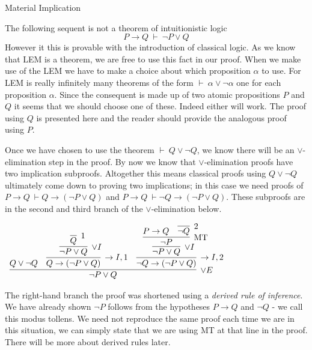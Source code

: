\documentclass{book}
\begin{document}
    \begin{eg}{Material Implication}

        The following sequent is not a theorem of intuitionistic logic $$ P \to Q \ \vdash \ \lnot P \lor Q$$ However it this is provable with the introduction of classical logic. As we know that LEM is a theorem, we are free to use this fact in our proof. When we make use of the LEM we have to make a choice about which proposition $\alpha$ to use. For LEM is really infinitely many theorems of the form $\vdash \ \alpha \lor \lnot \alpha$ one for each proposition $\alpha$. Since the consequent is made up of two atomic propositions $P$ and $Q$ it seems that we should choose one of these. Indeed either will work. The proof using $Q$ is presented here and the reader should provide the analogous proof using $P$. 

        Once we have chosen to use the theorem $\vdash \ Q \lor \lnot Q$, we know there will be an $\lor$-elimination step in the proof. By now we know that $\lor$-elimination proofs have two implication subproofs. Altogether this means classical proofs using $Q \lor \lnot Q$ ultimately come down to proving two implications; in this case we need proofs of $P \to Q \ \vdash Q \to (\lnot P \lor Q)$ and $P \to Q \ \vdash \lnot Q \to (\lnot P \lor Q)$. These subproofs are in the second and third branch of the $\lor$-elimination below. 

        \begin{center}
            $\begin{array}{c}
                \infer[\lor E]{\lnot P \lor Q}
                    {Q \lor \lnot Q
                    &
                    \infer[\to I,1]{Q \to (\lnot P \lor Q)}
                        {\infer[\lor I]{\lnot P \lor Q}
                            {\infer[1]{Q}
                                {}}}
                    &
                    \infer[\to I,2]{\lnot Q \to (\lnot P \lor Q)}
                        {\infer[\lor I]{\lnot P \lor Q}
                            {\infer[\MT]{\lnot P} 
                                {P \to Q
                                &
                                \infer[2]{\lnot Q}{}}}}}
            \end{array}$
        \end{center}
        
        The right-hand branch the proof was shortened using a \emph{derived rule of inference}. We have already shown $\lnot P$ follows from the hypotheses $P \to Q$ and $\lnot Q$ - we call this modus tollens. We need not reproduce the same proof each time we are in this situation, we can simply state that we are using MT at that line in the proof. There will be more about derived rules later. 

    \end{eg}
\end{document}
